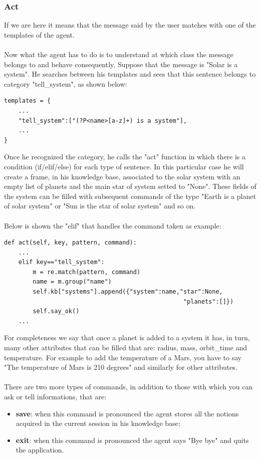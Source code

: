 \documentclass[12pt, a4paper]{article}
\begin{document}
\subsubsection{Act}\label{2.2.2}
If we are here it means that the message said by the user matches with one of the templates of the agent.
\\\\Now what the agent has to do is to understand at which class the message belongs to and behave consequently.
Suppose that the message is "Solar is a system". He searches between his templates and sees that this sentence belongs to category "tell\_system", as shown below:
\begin{lstlisting}
templates = {
	...
	"tell_system":["(?P<name>[a-z]+) is a system"],
	...
}
\end{lstlisting}
Once he recognized the category, he calls the "act" function in which there is a condition (if/elif/else) for each type of sentence. In this particular case he will create a frame, in his knowledge base, associated to the solar system with an empty list of planets and the main star of system setted to "None". These fields of the system can be filled with subsequent commands of the type "Earth is a planet of solar system" or "Sun is the star of solar system" and so on. 
\\\\Below is shown the "elif" that handles the command taken as example:
\begin{lstlisting}
def act(self, key, pattern, command):
	...
	elif key=="tell_system":
		m = re.match(pattern, command)
		name = m.group("name")
		self.kb["systems"].append({"system":name,"star":None,
												  "planets":[]})
		self.say_ok()
	...
\end{lstlisting}
For completeness we say that once a planet is added to a system it has, in turn, many other attributes that can be filled that are: radius, mass, orbit\_time and temperature. For example to add the temperature of a Mars, you have to say "The temperature of Mars is 210 degrees" and similarly for other attributes.
\\\\There are two more types of commands, in addition to those with which you can ask or tell informations, that are:
\begin{itemize}
\item \textbf{save}: when this command is pronounced the agent stores all the notions acquired in the current session in his knowledge base;
\item \textbf{exit}: when this command is pronounced the agent says "Bye bye" and quits the application.
\end{itemize}
\end{document}
